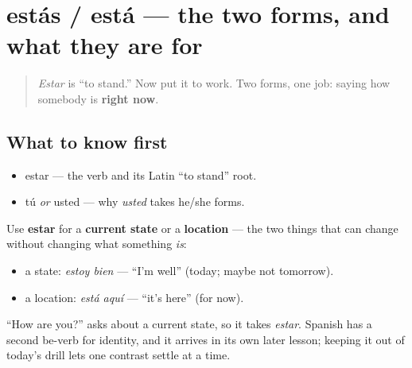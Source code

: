 \section[estás / está]{estás / está — the two forms, and what they are for}

\label{lesson:ES-C04-estar-estado}



\begin{quote}
\emph{Estar} is \textquotedblleft{}to stand.\textquotedblright{} Now put it to work. Two forms, one job: saying how somebody is \textbf{right now}.
\end{quote}

\subsection*{What to know first}
\begin{itemize}
\raggedright
  \item estar — the verb and its Latin \textquotedblleft{}to stand\textquotedblright{} root.
  \item tú \emph{or} usted — why \emph{usted} takes he/she forms.
\end{itemize}

\begin{grammarlens}[title={Grammar Lens: state and location use estar}]
Use \textbf{estar} for a \textbf{current state} or a \textbf{location} — the two things that can change without changing what something \emph{is}:

\begin{itemize}
\raggedright
  \item a state: \emph{estoy bien} — \textquotedblleft{}I'm well\textquotedblright{} (today; maybe not tomorrow).
  \item a location: \emph{está aquí} — \textquotedblleft{}it's here\textquotedblright{} (for now).
\end{itemize}

\textquotedblleft{}How are you?\textquotedblright{} asks about a current state, so it takes \emph{estar}. Spanish has a second be-verb for identity, and it arrives in its own later lesson; keeping it out of today's drill lets one contrast settle at a time.
\end{grammarlens}

